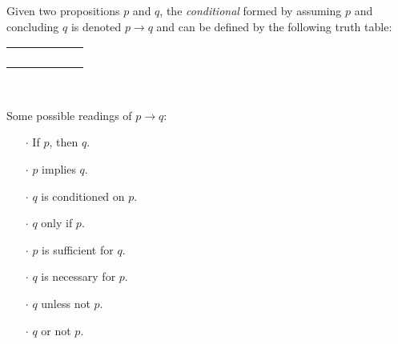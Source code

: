 \begin{definition}
    \begin{center}
        \begin{minipage}[t]{.55\linewidth}
            Given two propositions \(p\) and \(q\),
            the \emph{conditional} formed by assuming \(p\) and concluding \(q\)
            is denoted \(p \rightarrow q\) and can be defined by the following truth table:
            \begin{table}[H]
                \centering
                \label{tab:implies}
                \begin{tabular}{|CcCc||Cc|}
                    \hline
                     &  &  \\ \hline
                    \thead{\(\top\)} & \thead{\(\top\)} &  \\
                    \thead{\(\top\)} & \thead{\(\bot\)} &  \\
                    \thead{\(\bot\)} & \thead{\(\top\)} &  \\
                    \thead{\(\bot\)} & \thead{\(\bot\)} &  \\ \hline
                \end{tabular}
            \end{table}
        \end{minipage}%
        \begin{minipage}[t]{.05\linewidth}
            ~
        \end{minipage}%
        \begin{minipage}[t]{.4\linewidth}
            Some possible readings of \(p \rightarrow q\):\\
            \begin{itemize}
                \item[\(\cdot\)]
                    If \(p\), then \(q\).
                \item[\(\cdot\)]
                    \(p\) implies \(q\).
                \item[\(\cdot\)]
                    \(q\) is conditioned on \(p\).
                \item[\(\cdot\)]
                    \(q\) only if \(p\).
                \item[\(\cdot\)]
                    \(p\) is sufficient for \(q\).
                \item[\(\cdot\)]
                    \(q\) is necessary for \(p\).
                \item[\(\cdot\)]
                    \(q\) unless not \(p\).
                \item[\(\cdot\)]
                    \(q\) or not \(p\).
            \end{itemize}
        \end{minipage}
    \end{center}
\end{definition}

